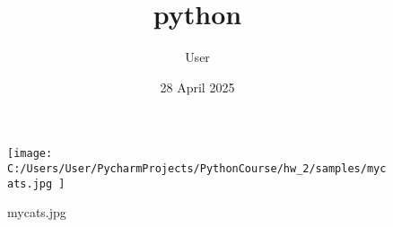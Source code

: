 \documentclass{article}
\title{python}
\author{ User }
\date{ 28 April 2025 }
\begin{document}
\begin{figure}
    \centering
    \texttt{[image:  C:/Users/User/PycharmProjects/PythonCourse/hw\_2/samples/mycats.jpg ]}
    \caption{ mycats.jpg }
    \label{fig:enter-label}
\end{figure}
\end{document}
